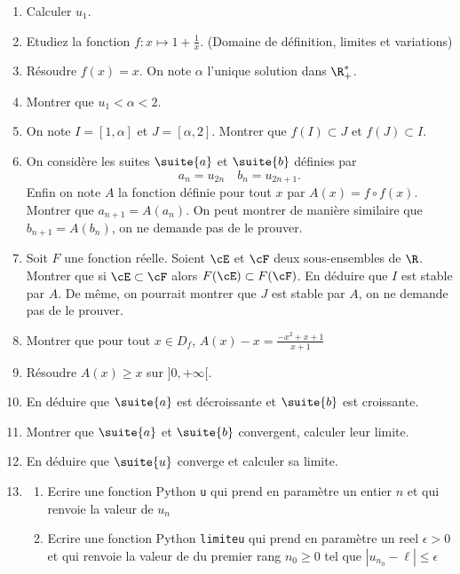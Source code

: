 \begin{exercice}
\begin{enumerate}
\item Calculer $u_1$.
\item Etudiez la fonction $f: x\mapsto 1+\frac{1}{x}$. (Domaine de définition, limites et variations) 
\item Résoudre $f(x)=x$. On note $\alpha$ l'unique solution dans $\R^*_+$. 
\item Montrer que $u_1<\alpha <2$.
\item On note $I=[1,\alpha]$ et $J=[\alpha,2]$. Montrer que $f(I)\subset J$ et $f(J)\subset I$.
\item On considère les suites $\suite{a}$ et  $\suite{b}$ définies par 
$$a_n=u_{2n} \quad b_n =u_{2n+1}.$$
Enfin on note $A$ la fonction définie pour tout $x$ par $A(x)=f\circ f(x)$.
 Montrer que $a_{n+1} =A (a_n)$. On peut montrer de manière similaire que 
 $b_{n+1} =A(b_n) $, on ne demande pas de le prouver. 
 \item Soit $F$ une fonction réelle. Soient $\cE $ et $\cF$ deux sous-ensembles de $\R$. Montrer que si $\cE\subset \cF$ alors $F(\cE)\subset F(\cF)$. En déduire que  $I$ est stable par $A$. De même, on pourrait montrer que $J$ est stable par $A$, on ne demande pas de le prouver. 
\item Montrer que pour tout $x\in D_f$, $A(x)-x =\frac{-x^2+x+1}{x+1}$ 
\item Résoudre $A(x)\geq x$ sur $]0,+\infty[$. 
\item  En déduire que $\suite{a}$ est décroissante et $\suite{b}$ est croissante. 
\item Montrer que $\suite{a}$ et $\suite{b}$ convergent, calculer leur limite. 
\item En déduire que $\suite{u}$ converge et calculer sa limite. 
\item \begin{enumerate}
\item Ecrire une fonction Python \texttt{u} qui prend en paramètre un entier $n$ et qui renvoie la valeur de $u_n$
\item Ecrire une fonction Python \texttt{limiteu} qui prend en paramètre un reel $\epsilon>0$ et  qui renvoie la valeur de du premier rang $n_0\geq 0$ tel que $|u_{n_0} -\ell|\leq \epsilon$ 
\end{enumerate}

\end{enumerate}

\end{exercice}

